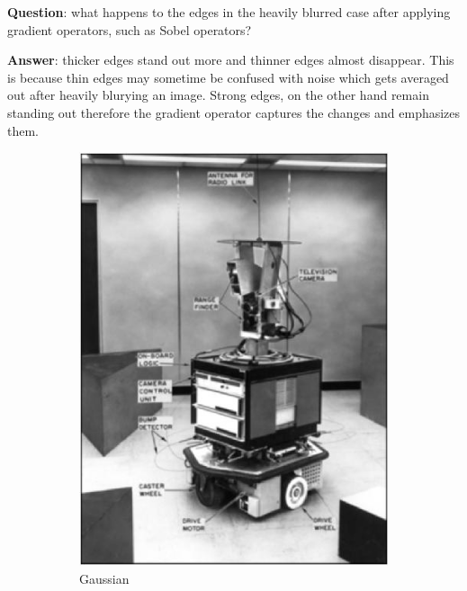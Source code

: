 \documentclass[lettersize,journal]{IEEEtran}
\begin{document}
\hfill

\noindent\textbf{Question}: what happens to the edges in the heavily blurred case after applying gradient operators, such as Sobel operators?

\hfill

\noindent\textbf{Answer}: thicker edges stand out more and thinner edges almost disappear. This is because thin edges may sometime be confused with noise which gets averaged out after heavily blurying an image. Strong edges, on the other hand remain standing out therefore the gradient operator captures the changes and emphasizes them.

\begin{figure}[h]
    \centering 
    \begin{subfigure}[h]{0.155\textwidth}
        \centering 
        \includegraphics[width=\linewidth]{heavy_blur}
        \caption{Gaussian}  
    \end{subfigure}
    \begin{subfigure}[h]{0.155\textwidth}

\end{subfigure}
\end{figure}
\end{document}
